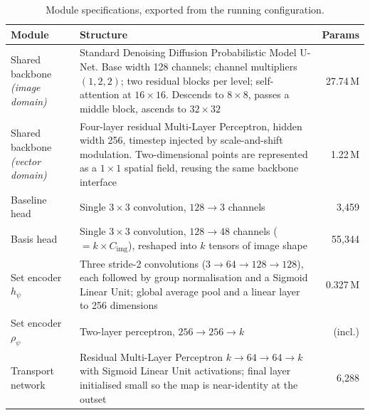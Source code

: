 \documentclass[11pt]{article}
\begin{document}
\begin{table}[htbp]
\centering\small
\begin{tabular}{@{}p{3.4cm}p{7.6cm}r@{}}
\toprule
\textbf{Module} & \textbf{Structure} & \textbf{Params} \\
\midrule
Shared backbone \newline \textit{(image domain)}
  & Standard Denoising Diffusion Probabilistic Model U-Net. Base width 128 channels; channel
    multipliers $(1,2,2)$; two residual blocks per level; self-attention at $16\times16$. Descends to
    $8\times8$, passes a middle block, ascends to $32\times32$
  & 27.74\,M \\[3pt]
Shared backbone \newline \textit{(vector domain)}
  & Four-layer residual Multi-Layer Perceptron, hidden width 256, timestep injected by
    scale-and-shift modulation. Two-dimensional points are represented as a $1\times1$ spatial
    field, reusing the same backbone interface
  & 1.22\,M \\[3pt]
Baseline head & Single $3\times3$ convolution, $128\to3$ channels & 3{,}459 \\[3pt]
Basis head & Single $3\times3$ convolution, $128\to48$ channels ($=k\times C_{\mathrm{img}}$),
             reshaped into $k$ tensors of image shape & 55{,}344 \\[3pt]
Set encoder $h_\psi$
  & Three stride-2 convolutions ($3\to64\to128\to128$), each followed by group normalisation and a
    Sigmoid Linear Unit; global average pool and a linear layer to 256 dimensions & 0.327\,M \\[3pt]
Set encoder $\rho_\psi$ & Two-layer perceptron, $256\to256\to k$ & (incl.) \\[3pt]
Transport network & Residual Multi-Layer Perceptron $k\to64\to64\to k$ with Sigmoid Linear Unit
    activations; final layer initialised small so the map is near-identity at the outset & 6{,}288 \\
\bottomrule
\end{tabular}
\caption{Module specifications, exported from the running configuration.}
\label{tab:modspec}
\end{table}
\end{document}
